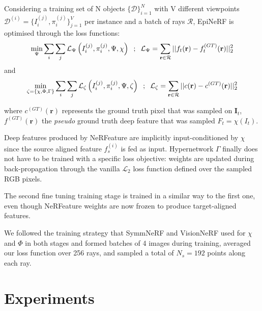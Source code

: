 Considering a training set of N objects $\{\mathcal{D}\}_{i=1}^{N}$ with V different viewpoints $\mathcal{D}^{(i)} = \{I_{i}^{(j)},\pi_{i}^{(j)}\}_{j=1}^{V}$ per instance and a batch of rays $\mathcal{R}$, EpiNeRF is optimised through the loss functions: 
\begin{equation}
 \min_{\Psi} \sum_{i}\sum_{j}\mathcal{L}_{\Psi}\left(I_{i}^{(j)},\pi_{i}^{(j)},\Psi,\chi \right) \hspace{.2cm} ; \hspace{.2cm}\mathcal{L}_{\Psi}= \sum_{\mathbf{r}\in\mathcal{R}} || f_{t}(\mathbf{r}) - f_{t}^{(GT)}(\mathbf{r}) ||_{2}^{2}
\end{equation}
and 
\begin{equation}
 \min_{\zeta=\{\chi,\Phi,\Gamma\}}\sum_{i}\sum_{j}\mathcal{L}_{\zeta}\left(I_{i}^{(j)},\pi_{i}^{(j)},\Psi,\zeta \right)\hspace{.2cm}  ; \hspace{.2cm}\mathcal{L}_{\zeta}= \sum_{\mathbf{r}\in\mathcal{R}} || c(\mathbf{r}) - c^{(GT)}(\mathbf{r}) ||_{2}^{2}
\end{equation}


where $c^{(GT)}(\mathbf{r})$ represents the ground truth pixel that was sampled on $\mathbf{I}_{t}$, $f^{(GT)}(\mathbf{r})$ the \textit{pseudo} ground truth deep feature that was sampled $F_{t}=\chi(I_{t})$.
\newline

Deep features produced by NeRFeature are implicitly input-conditioned by $\chi$ since the source aligned feature $f_s^{(i)}$ is fed as input. Hypernetwork $\Gamma$ finally does not have to be trained with a specific loss objective: weights are updated during back-propagation through the vanilla $\mathcal{L}_{2}$ loss function defined over the sampled RGB pixels. 

The second fine tuning training stage is trained in a similar way to the first one, even though NeRFeature weights are now frozen to produce target-aligned features. 

We followed the training strategy that SymmNeRF \cite{symmnerf} and VisionNeRF \cite{visionnerf} used for $\chi$ and $\Phi$ in both stages and formed batches of 4 images during training, averaged our loss function over 256 rays, and sampled a total of $N_{s}=192$ points along each ray.

\section{Experiments}
